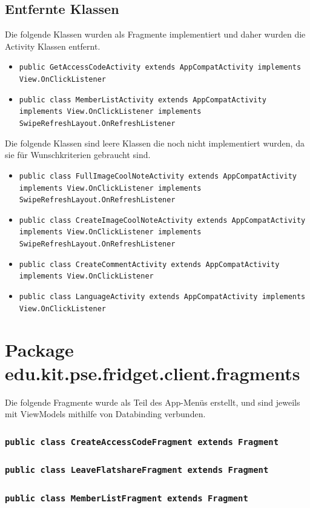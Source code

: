 \documentclass[a4paper]{scrreprt}
\begin{document}
		\subsection{Entfernte Klassen}
			Die folgende Klassen wurden als Fragmente implementiert und daher wurden die Activity Klassen entfernt.
			\begin{itemize}
				\item \texttt{public GetAccessCodeActivity extends AppCompatActivity implements View.OnClickListener}
				\item \texttt{public class MemberListActivity extends AppCompatActivity implements View.OnClickListener implements SwipeRefreshLayout.OnRefreshListener}
			\end{itemize}
			Die folgende Klassen sind leere Klassen die noch nicht implementiert wurden, da sie für Wunschkriterien gebraucht sind.
			\begin{itemize}
				\item \texttt{public class FullImageCoolNoteActivity extends AppCompatActivity implements View.OnClickListener implements SwipeRefreshLayout.OnRefreshListener}
				\item \texttt{public class CreateImageCoolNoteActivity extends AppCompatActivity implements View.OnClickListener implements SwipeRefreshLayout.OnRefreshListener}
				\item \texttt{public class CreateCommentActivity extends AppCompatActivity implements View.OnClickListener}
				\item \texttt{public class LanguageActivity extends AppCompatActivity implements View.OnClickListener}
			\end{itemize}
		
	
	 \section{Package edu.kit.pse.fridget.client.fragments} 
	Die folgende Fragmente wurde als Teil des App-Menüs erstellt, und sind jeweils mit ViewModels mithilfe von Databinding verbunden. 
	\subsubsection{\texttt{public class CreateAccessCodeFragment extends Fragment}} 
	\subsubsection{\texttt{public class LeaveFlatshareFragment extends Fragment}} 
	\subsubsection{\texttt{public class MemberListFragment extends Fragment}} 
	
\end{document}
